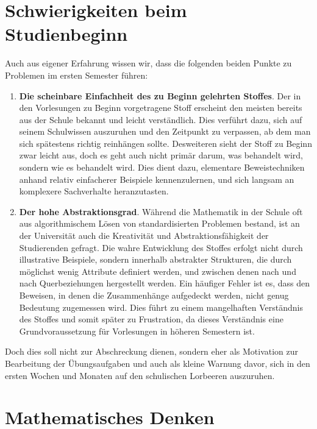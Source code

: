 \section{Schwierigkeiten beim Studienbeginn}
Auch aus eigener Erfahrung wissen wir, dass die folgenden beiden Punkte zu Problemen im ersten
Semester führen:
\begin{enumerate}
    \item
    \textbf{Die scheinbare Einfachheit des zu Beginn gelehrten Stoffes}. 
    Der in den Vorlesungen zu Beginn vorgetragene Stoff erscheint den meisten bereits aus der Schule bekannt 
    und leicht verständlich. Dies verführt dazu, sich auf seinem Schulwissen auszuruhen und den Zeitpunkt zu verpassen, 
    ab dem man sich spätestens richtig reinhängen sollte. Desweiteren sieht der Stoff zu Beginn zwar leicht aus, doch es geht 
    auch nicht primär darum, was behandelt wird, sondern wie es behandelt wird. Dies dient dazu, elementare Beweistechniken
    anhand relativ einfacherer Beispiele kennenzulernen, und sich langsam an komplexere Sachverhalte heranzutasten. 
    \item
    \textbf{Der hohe Abstraktionsgrad}. Während die Mathematik in der Schule oft aus algorithmischem Lösen von standardisierten 
    Problemen bestand, ist an der Universität auch die Kreativität und Abstraktionsfähigkeit der Studierenden gefragt.
    Die wahre Entwicklung des Stoffes erfolgt nicht durch illustrative Beispiele, sondern innerhalb abstrakter Strukturen, die durch 
    möglichst wenig Attribute definiert werden, und zwischen denen nach und nach Querbeziehungen hergestellt werden. 
    Ein häufiger Fehler ist es, dass den Beweisen, in denen die Zusammenhänge aufgedeckt werden, nicht genug Bedeutung zugemessen wird.
    Dies führt zu einem mangelhaften Verständnis des Stoffes und somit später zu Frustration, da dieses Verständnis eine Grundvoraussetzung 
    für Vorlesungen in höheren Semestern ist. 
\end{enumerate}
Doch dies soll nicht zur Abschreckung dienen, sondern eher als Motivation zur Bearbeitung der Übungsaufgaben und auch als kleine Warnung davor, 
sich in den ersten Wochen und Monaten auf den schulischen Lorbeeren auszuruhen. 

\section{Mathematisches Denken}

